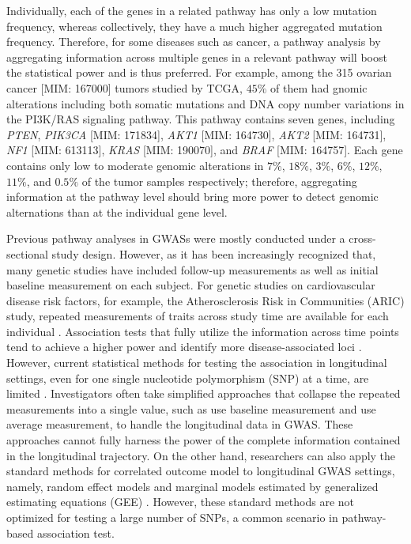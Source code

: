 \documentclass[12pt]{article}
\begin{document}
Individually, each of the genes in a related pathway has only a low mutation frequency, whereas collectively, they have a much higher aggregated mutation frequency. Therefore, for some diseases such as cancer, a pathway analysis by aggregating information across multiple genes in a relevant pathway will boost the statistical power and is thus preferred. For example, among the 315 ovarian cancer [MIM: 167000] tumors studied by TCGA, $45\%$ of them had gnomic alterations including both somatic mutations and DNA copy number variations in the PI3K/RAS signaling pathway. This pathway contains seven genes, including \textit{PTEN}, \textit{PIK3CA} [MIM: 171834], \textit{AKT1} [MIM: 164730], \textit{AKT2} [MIM: 164731], \textit{NF1} [MIM: 613113], \textit{KRAS} [MIM: 190070], and \textit{BRAF} [MIM: 164757]. Each gene contains only low to moderate genomic alterations in $7\%$, $18\%$, $3\%$, $6\%$, $12\%$, $11\%$, and $0.5\%$ of the tumor samples respectively; therefore, aggregating information at the pathway level should bring more power to detect genomic alternations than at the individual gene level.

Previous pathway analyses in GWASs were mostly conducted under a cross-sectional study design. However, as it has been increasingly recognized that, many genetic studies have included follow-up measurements as well as initial baseline measurement on each subject. For genetic studies on cardiovascular disease risk factors, for example, the Atherosclerosis Risk in Communities (ARIC) study, repeated measurements of traits across study time are available for each individual \cite{Heiss1989}. Association tests that fully utilize the information across time points tend to achieve a higher power and identify more disease-associated loci \cite{Furlotte2012,Xu2014}. However, current statistical methods for testing the association in longitudinal settings, even for one single nucleotide polymorphism (SNP) at a time, are limited \cite{Fan2012,Furlotte2012}. Investigators often take simplified approaches that collapse the repeated measurements into a single value, such as use baseline measurement and use average measurement, to handle the longitudinal data in GWAS. These approaches cannot fully harness the power of the complete information contained in the longitudinal trajectory. On the other hand, researchers can also apply the standard methods for correlated outcome model to longitudinal GWAS settings, namely, random effect models \cite{laird1982random} and marginal models estimated by generalized estimating equations (GEE) \cite{liang1986longitudinal,zeger1988models}. However, these standard methods are not optimized for testing a large number of SNPs, a common scenario in pathway-based association test.
\end{document}
